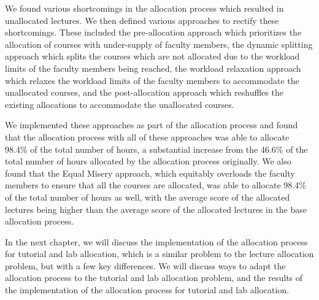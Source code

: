 We found various shortcomings in the allocation process which resulted in unallocated lectures. We then defined various approaches to rectify these shortcomings. These included the pre-allocation approach which prioritizes the allocation of courses with under-supply of faculty members, the dynamic splitting approach which splits the courses which are not allocated due to the workload limits of the faculty members being reached, the workload relaxation approach which relaxes the workload limits of the faculty members to accommodate the unallocated courses, and the post-allocation approach which reshuffles the existing allocations to accommodate the unallocated courses.

We implemented these approaches as part of the allocation process and found that the allocation process with all of these approaches was able to allocate 98.4\% of the total number of hours, a substantial increase from the 46.6\% of the total number of hours allocated by the allocation process originally. We also found that the Equal Misery approach, which equitably overloads the faculty members to ensure that all the courses are allocated, was able to allocate 98.4\% of the total number of hours as well, with the average score of the allocated lectures being higher than the average score of the allocated lectures in the base allocation process.

In the next chapter, we will discuss the implementation of the allocation process for tutorial and lab allocation, which is a similar problem to the lecture allocation problem, but with a few key differences. We will discuss ways to adapt the allocation process to the tutorial and lab allocation problem, and the results of the implementation of the allocation process for tutorial and lab allocation.

